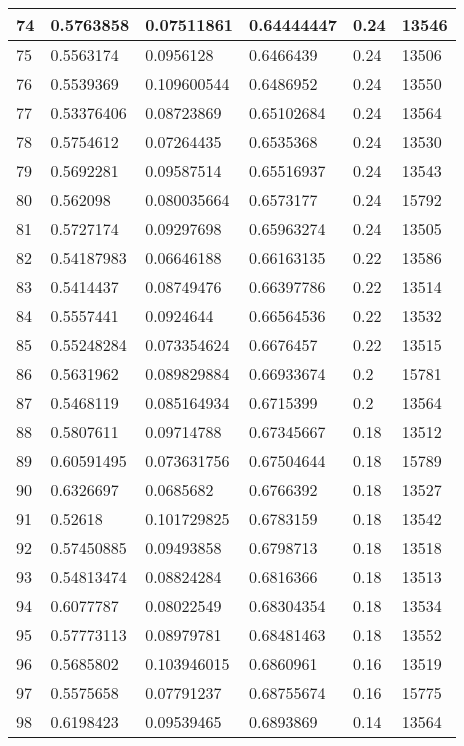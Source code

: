 \begin{longtable}{|l|l|l|l|l|l|}
74 & 0.5763858 & 0.07511861 & 0.64444447 & 0.24 & 13546 \\ \hline 
75 & 0.5563174 & 0.0956128 & 0.6466439 & 0.24 & 13506 \\ \hline 
76 & 0.5539369 & 0.109600544 & 0.6486952 & 0.24 & 13550 \\ \hline 
77 & 0.53376406 & 0.08723869 & 0.65102684 & 0.24 & 13564 \\ \hline 
78 & 0.5754612 & 0.07264435 & 0.6535368 & 0.24 & 13530 \\ \hline 
79 & 0.5692281 & 0.09587514 & 0.65516937 & 0.24 & 13543 \\ \hline 
80 & 0.562098 & 0.080035664 & 0.6573177 & 0.24 & 15792 \\ \hline 
81 & 0.5727174 & 0.09297698 & 0.65963274 & 0.24 & 13505 \\ \hline 
82 & 0.54187983 & 0.06646188 & 0.66163135 & 0.22 & 13586 \\ \hline 
83 & 0.5414437 & 0.08749476 & 0.66397786 & 0.22 & 13514 \\ \hline 
84 & 0.5557441 & 0.0924644 & 0.66564536 & 0.22 & 13532 \\ \hline 
85 & 0.55248284 & 0.073354624 & 0.6676457 & 0.22 & 13515 \\ \hline 
86 & 0.5631962 & 0.089829884 & 0.66933674 & 0.2 & 15781 \\ \hline 
87 & 0.5468119 & 0.085164934 & 0.6715399 & 0.2 & 13564 \\ \hline 
88 & 0.5807611 & 0.09714788 & 0.67345667 & 0.18 & 13512 \\ \hline 
89 & 0.60591495 & 0.073631756 & 0.67504644 & 0.18 & 15789 \\ \hline 
90 & 0.6326697 & 0.0685682 & 0.6766392 & 0.18 & 13527 \\ \hline 
91 & 0.52618 & 0.101729825 & 0.6783159 & 0.18 & 13542 \\ \hline 
92 & 0.57450885 & 0.09493858 & 0.6798713 & 0.18 & 13518 \\ \hline 
93 & 0.54813474 & 0.08824284 & 0.6816366 & 0.18 & 13513 \\ \hline 
94 & 0.6077787 & 0.08022549 & 0.68304354 & 0.18 & 13534 \\ \hline 
95 & 0.57773113 & 0.08979781 & 0.68481463 & 0.18 & 13552 \\ \hline 
96 & 0.5685802 & 0.103946015 & 0.6860961 & 0.16 & 13519 \\ \hline 
97 & 0.5575658 & 0.07791237 & 0.68755674 & 0.16 & 15775 \\ \hline 
98 & 0.6198423 & 0.09539465 & 0.6893869 & 0.14 & 13564 \\ \hline 

\end{longtable}
